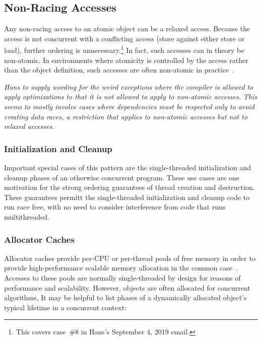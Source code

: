 \documentclass[10]{article}
\begin{document}
\subsection{Non-Racing Accesses}
\label{sec:Non-Racing Accesses}

Any non-racing access to an atomic object can be a relaxed access.
Because the access is not concurrent with a conflicting access (store
against either store or load), further ordering is unnecessary.\footnote{
	This covers case~\#8 in Hans's September 4, 2019 email.}
In fact, such accesses can in theory be non-atomic.
In environments where atomicity is controlled by the access rather
than the object definition, such accesses are often non-atomic in
practice~\cite{JadeAlglave2019WhoAfraidCompiler}.

\emph{Hans to supply wording for the weird exceptions where the compiler
is allowed to apply optimizations to  that it
is not allowed to apply to non-atomic accesses.
This seems to mostly involve cases where dependencies must be respected
only to avoid creating data races, a restriction that applies to
non-atomic accesses but not to relaxed accesses.}

\subsubsection{Initialization and Cleanup}
\label{sec:Initialization and Cleanup}

Important special cases of this pattern are the single-threaded
initialization and cleanup phases of an otherwise concurrent program.
These use cases are one motivation for the strong ordering guarantees
of thread creation and destruction.
These guarantees permitt the single-threaded initialization and cleanup
code to run race free, with no need to consider interference from
code that runs multithreaded.

\subsubsection{Allocator Caches}
\label{sec:Allocator Caches}

Allocator caches provide per-CPU or per-thread pools of free memory
in order to provide high-performance scalable memory allocation in
the common case~\cite{McKenney93}.
Accesses to these pools are normally single-threaded by design for
reasons of performance and scalability.
However, objects are often allocated for concurrent algorithms,
It may be helpful to list phases of a dynamically allocated object's
typical lifetime in a concurrent context:
\end{document}
